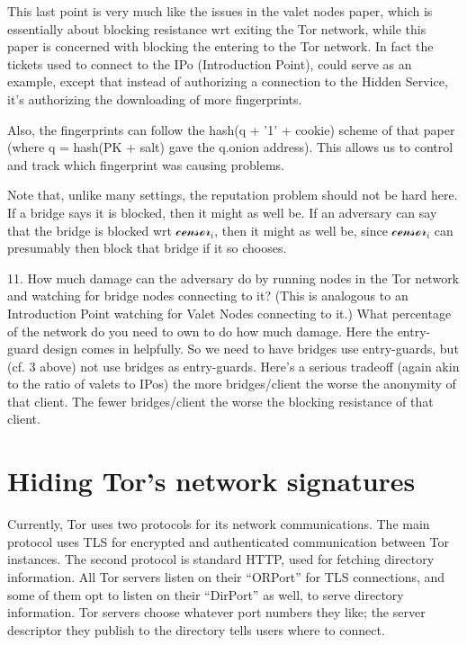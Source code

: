 \documentclass{llncs}
\begin{document}
This last point is very much like the issues in the valet nodes paper,
which is essentially about blocking resistance wrt exiting the Tor network,
while this paper is concerned with blocking the entering to the Tor network.
In fact the tickets used to connect to the IPo (Introduction Point),
could serve as an example, except that instead of authorizing
a connection to the Hidden Service, it's authorizing the downloading
of more fingerprints.

Also, the fingerprints can follow the hash(q + '1' + cookie) scheme of
that paper (where q = hash(PK + salt) gave the q.onion address).  This
allows us to control and track which fingerprint was causing problems.

Note that, unlike many settings, the reputation problem should not be
hard here. If a bridge says it is blocked, then it might as well be.
If an adversary can say that the bridge is blocked wrt
$\mathcal{censor}_i$, then it might as well be, since
$\mathcal{censor}_i$ can presumably then block that bridge if it so
chooses.

11. How much damage can the adversary do by running nodes in the Tor
network and watching for bridge nodes connecting to it?  (This is
analogous to an Introduction Point watching for Valet Nodes connecting
to it.) What percentage of the network do you need to own to do how
much damage. Here the entry-guard design comes in helpfully.  So we
need to have bridges use entry-guards, but (cf. 3 above) not use
bridges as entry-guards. Here's a serious tradeoff (again akin to the
ratio of valets to IPos) the more bridges/client the worse the
anonymity of that client. The fewer bridges/client the worse the 
blocking resistance of that client.


\section{Hiding Tor's network signatures}
\label{sec:network-signature}
\label{subsec:enclave-dirs}

Currently, Tor uses two protocols for its network communications. The
main protocol uses TLS for encrypted and authenticated communication
between Tor instances. The second protocol is standard HTTP, used for
fetching directory information. All Tor servers listen on their ``ORPort''
for TLS connections, and some of them opt to listen on their ``DirPort''
as well, to serve directory information. Tor servers choose whatever port
numbers they like; the server descriptor they publish to the directory
tells users where to connect.
\end{document}
